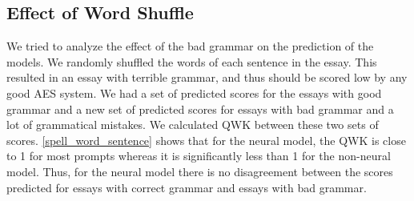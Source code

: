 \documentclass[11pt,a4paper]{article}
\begin{document}

\subsection{Effect of Word Shuffle}
We tried to analyze the effect of the bad grammar on the prediction of the models. We randomly shuffled the words of each sentence in the essay. This resulted in an essay with terrible grammar, and thus should be scored low by any good AES system. We had a set of predicted scores for the essays with good grammar and a new set of predicted scores for essays with bad grammar and a lot of grammatical mistakes. We calculated QWK between these two sets of scores. \cref{spell_word_sentence} shows that for the neural model, the QWK is close to 1 for most prompts whereas it is significantly less than 1 for the non-neural model. Thus, for the neural model there is no disagreement between the scores predicted for essays with correct grammar and essays with bad grammar.
\end{document}

